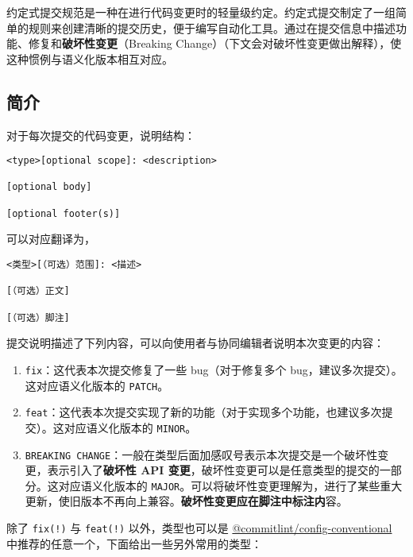 
\begin{issues}
\issueDraft
\issueTODO
\end{issues}

约定式提交规范是一种在进行代码变更时的轻量级约定。约定式提交制定了一组简单的规则来创建清晰的提交历史，便于编写自动化工具。通过在提交信息中描述功能、修复和\textbf{破坏性变更}（Breaking Change）（下文会对破坏性变更做出解释），使这种惯例与语义化版本相互对应。

\subsection{简介}
对于每次提交的代码变更，说明结构：
\begin{lstlisting}[language=none]
<type>[optional scope]: <description>

[optional body]

[optional footer(s)]
\end{lstlisting}
可以对应翻译为，
\begin{lstlisting}[language=none]
<类型>[（可选）范围]: <描述>

[（可选）正文]

[（可选）脚注]
\end{lstlisting}
提交说明描述了下列内容，可以向使用者与协同编辑者说明本次变更的内容：
\begin{enumerate}
\item \verb`fix`：这代表本次提交修复了一些 bug（对于修复多个 bug，建议多次提交）。这对应语义化版本的 \verb`PATCH`。
\item \verb`feat`：这代表本次提交实现了新的功能（对于实现多个功能，也建议多次提交）。这对应语义化版本的 \verb`MINOR`。
\item \verb`BREAKING CHANGE`：一般在类型后面加感叹号表示本次提交是一个破坏性变更，表示引入了\textbf{破坏性 API 变更}，破坏性变更可以是任意类型的提交的一部分。这对应语义化版本的 \verb`MAJOR`。可以将破坏性变更理解为，进行了某些重大更新，使旧版本不再向上兼容。\textbf{破坏性变更应在脚注中标注内}容。
\end{enumerate}
除了 \verb`fix(!)` 与 \verb`feat(!)` 以外，类型也可以是 \href{https://github.com/conventional-changelog/commitlint/tree/master/\%2540commitlint/config-conventional}{@commitlint/config-conventional} 中推荐的任意一个，下面给出一些另外常用的类型：
